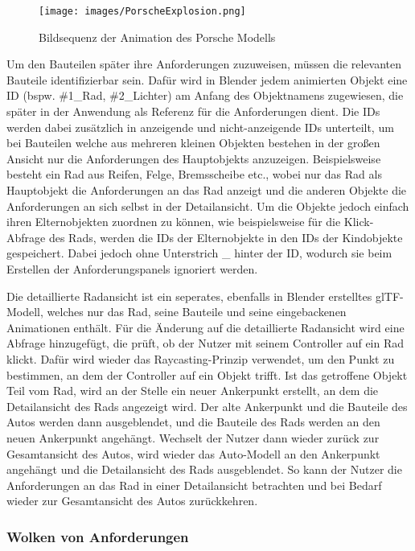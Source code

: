 \begin{figure}[H]
    \centering
    \texttt{[image: images/PorscheExplosion.png]}
    \caption{Bildsequenz der Animation des Porsche Modells}
    \label{fig:porsche-explosion}
\end{figure}

Um den Bauteilen später ihre Anforderungen zuzuweisen, müssen die relevanten Bauteile identifizierbar sein.
Dafür wird in Blender jedem animierten Objekt eine ID (bspw. \#1\_Rad, \#2\_Lichter) am Anfang des Objektnamens zugewiesen, die später in der Anwendung als Referenz für die Anforderungen dient.
Die IDs werden dabei zusätzlich in anzeigende und nicht-anzeigende IDs unterteilt, um bei Bauteilen welche aus mehreren kleinen Objekten bestehen in der großen Ansicht nur die Anforderungen des Hauptobjekts anzuzeigen.
Beispielsweise besteht ein Rad aus Reifen, Felge, Bremsscheibe etc., wobei nur das Rad als Hauptobjekt die Anforderungen an das Rad anzeigt und die anderen Objekte die Anforderungen an sich selbst in der Detailansicht.
Um die Objekte jedoch einfach ihren Elternobjekten zuordnen zu können, wie beispielsweise für die Klick-Abfrage des Rads, werden die IDs der Elternobjekte in den IDs der Kindobjekte gespeichert.
Dabei jedoch ohne Unterstrich \glqq{}\_\grqq{} hinter der ID, wodurch sie beim Erstellen der Anforderungspanels ignoriert werden.

Die detaillierte Radansicht ist ein seperates, ebenfalls in Blender erstelltes glTF-Modell, welches nur das Rad, seine Bauteile und seine eingebackenen Animationen enthält.
Für die Änderung auf die detaillierte Radansicht wird eine Abfrage hinzugefügt, die prüft, ob der Nutzer mit seinem Controller auf ein Rad klickt.
Dafür wird wieder das Raycasting-Prinzip verwendet, um den Punkt zu bestimmen, an dem der Controller auf ein Objekt trifft.
Ist das getroffene Objekt Teil vom Rad, wird an der Stelle ein neuer Ankerpunkt erstellt, an dem die Detailansicht des Rads angezeigt wird.
Der alte Ankerpunkt und die Bauteile des Autos werden dann ausgeblendet, und die Bauteile des Rads werden an den neuen Ankerpunkt angehängt.
Wechselt der Nutzer dann wieder zurück zur Gesamtansicht des Autos, wird wieder das Auto-Modell an den Ankerpunkt angehängt und die Detailansicht des Rads ausgeblendet.
So kann der Nutzer die Anforderungen an das Rad in einer Detailansicht betrachten und bei Bedarf wieder zur Gesamtansicht des Autos zurückkehren.





\subsubsection{Wolken von Anforderungen}

